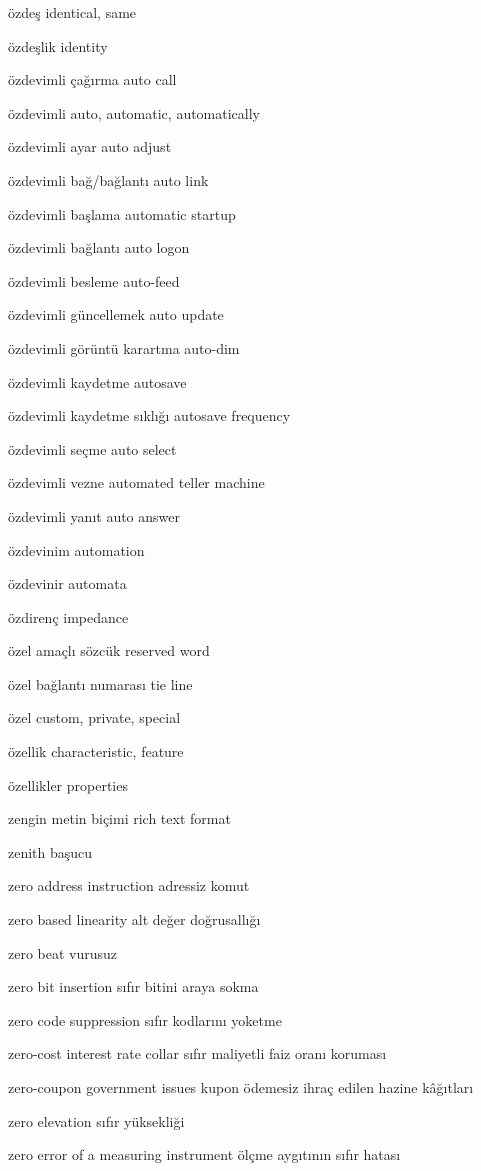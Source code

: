\documentclass[12pt,fleqn]{article}\usepackage{../../common}
\begin{document}
özdeş identical, same

özdeşlik identity

özdevimli çağırma auto call

özdevimli auto, automatic, automatically

özdevimli ayar auto adjust

özdevimli bağ/bağlantı auto link

özdevimli başlama automatic startup

özdevimli bağlantı auto logon

özdevimli besleme auto-feed

özdevimli güncellemek auto update

özdevimli görüntü karartma auto-dim

özdevimli kaydetme autosave

özdevimli kaydetme sıklığı autosave frequency

özdevimli seçme auto select

özdevimli vezne automated teller machine

özdevimli yanıt auto answer

özdevinim automation

özdevinir automata

özdirenç impedance

özel amaçlı sözcük reserved word

özel bağlantı numarası tie line

özel custom, private, special

özellik characteristic, feature

özellikler properties

zengin metin biçimi rich text format

zenith başucu

zero address instruction adressiz komut

zero based linearity alt değer doğrusallığı

zero beat vurusuz

zero bit insertion sıfır bitini araya sokma

zero code suppression sıfır kodlarını yoketme

zero-cost interest rate collar sıfır maliyetli faiz oranı koruması

zero-coupon government issues kupon ödemesiz ihraç edilen hazine kâğıtları

zero elevation sıfır yüksekliği

zero error of a measuring instrument ölçme aygıtının sıfır hatası
\end{document}
